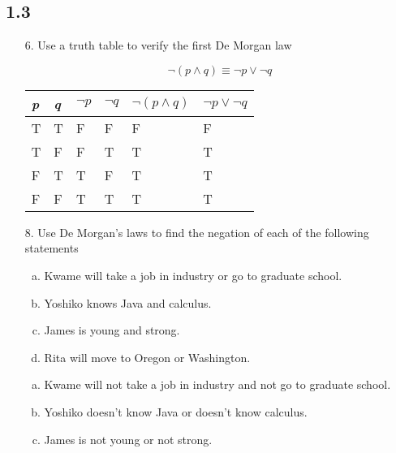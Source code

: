 \subsection{1.3}
\begin{itemize}
    \item[6.]Use a truth table to verify the first De Morgan law

          \[
              \neg (p \land q) \equiv \neg p \lor \neg q
          \]
          \answer
          \begin{longtable}[c]{|l|l|l|l|l|l|}
              \hline
              \textit{p} & \textit{q} & $\neg p$ & $\neg q$ & $\neg (p \land q)$ & $\neg p \lor \neg q$ \\
              \hline
              \endfirsthead
              T          & T          & F        & F        & F                  & F                    \\
              \hline
              T          & F          & F        & T        & T                  & T                    \\
              \hline
              F          & T          & T        & F        & T                  & T                    \\
              \hline
              F          & F          & T        & T        & T                  & T                    \\
              \hline
          \end{longtable}
    \item[8.]Use De Morgan’s laws to find the negation of each of the following statements
          \begin{enumerate}[a.]
              \item Kwame will take a job in industry or go to graduate school.
              \item Yoshiko knows Java and calculus.
              \item James is young and strong.
              \item Rita will move to Oregon or Washington.
          \end{enumerate}
          \answer
          \begin{enumerate}[a.]
              \item Kwame will not take a job in industry and not go to graduate school.
              \item Yoshiko doesn’t know Java or doesn’t know calculus.
              \item James is not young or not strong.

\end{enumerate}
\end{itemize}
